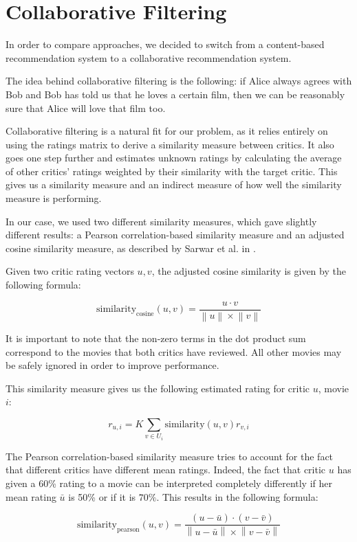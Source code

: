 \documentclass[10.5pt]{article}
\newcommand{\norm}[1]{\left\lVert#1\right\rVert}
\begin{document}
\section{Collaborative Filtering}

In order to compare 
approaches, we decided to switch from a content-based recommendation system to
a collaborative recommendation system.

The idea behind collaborative filtering is the following: if Alice always
agrees with Bob and Bob has told us that he loves a certain film, then we can
be reasonably sure that Alice will love that film too.

Collaborative filtering is a natural fit for our problem, as it relies entirely
on using the ratings matrix to derive a similarity measure between critics. It
also goes one step further and estimates unknown ratings by calculating the
average of other critics' ratings weighted by their similarity with the target
critic. This gives us a similarity measure and an indirect measure of how well
the similarity measure is performing.

In our case, we used two different similarity measures, which gave slightly
different results: a Pearson correlation-based similarity measure and an
adjusted cosine similarity measure, as described by Sarwar et al. in
\cite{Sarwar01}.

Given two critic rating vectors $u,v$, the adjusted cosine similarity is given
by the following formula:

$$ \text{similarity}_{\text{cosine}}(u,v) =
\frac{u \cdot v}{\norm{u} \times \norm{v}} $$

It is important to note that the non-zero terms in the dot product sum
correspond to the movies that both critics have reviewed. All other movies may
be safely ignored in order to improve performance.

This similarity measure gives us the following estimated rating for critic $u$,
movie $i$:

$$ r_{u,i} = K \sum_{v \in U_i} \text{similarity}(u,v) r_{v,i} $$

The Pearson correlation-based similarity measure tries to account for the fact
that different critics have different mean ratings. Indeed, the fact that
critic $u$ has given a 60\% rating to a movie
can be interpreted completely differently if her mean rating
$\bar{u}$ is 50\% or if it is $70\%$. This results in the following formula:

$$ \text{similarity}_{\text{pearson}}(u,v) =
\frac{ (u - \bar{u}) \cdot (v - \bar{v})}
{\norm{u - \bar{u}} \times \norm{v-\bar{v}}} $$
\end{document}
